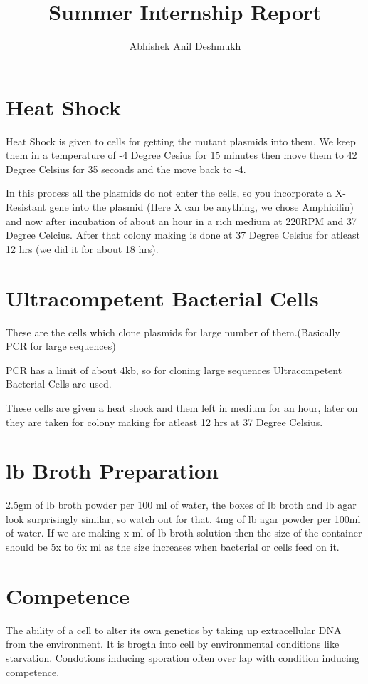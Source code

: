 \documentclass[11pt,twoside,a4paper]{article}
\author{Abhishek Anil Deshmukh}
\title{Summer Internship Report}
\begin{document}
\maketitle

\section{Heat Shock}
Heat Shock  is given to cells for getting the mutant plasmids into them, We keep them in a temperature of -4 Degree Cesius for 15 minutes then move them to 42 Degree Celsius for 35 seconds and the move back to -4.

In this process all the plasmids do not enter the cells, so you incorporate a X-Resistant gene into the plasmid (Here X can be anything, we chose Amphicilin) and now after incubation of about an hour in a rich medium at 220RPM and 37 Degree Celcius. After that colony making is done at 37 Degree Celsius for atleast 12 hrs (we did it for about 18 hrs).

\section{Ultracompetent Bacterial Cells}
These are the cells which clone plasmids for large number of them.(Basically PCR for large sequences)

PCR has a limit of about 4kb, so for cloning large sequences Ultracompetent Bacterial Cells are used.

These cells are given a heat shock and them left in medium for an hour, later on they are taken for colony making for atleast 12 hrs at 37 Degree Celsius.
\section{lb Broth Preparation}
2.5gm of lb broth powder per 100 ml of water, the boxes of lb broth and lb agar look surprisingly similar, so watch out for that. 4mg of lb agar powder per 100ml of water. If we are making x ml of lb broth solution then the size of the container should be 5x to 6x ml as the size increases when bacterial or cells feed on it.

\section{Competence}
The ability of a cell to alter its own genetics by taking up extracellular DNA from the environment. It is brogth into cell by environmental conditions like starvation. Condotions inducing sporation often over lap with condition inducing competence.
\end{document}
